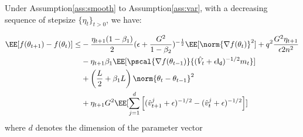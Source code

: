 \documentclass[11pt]{article}
\begin{document}
\begin{Lemma}\label{lem:lemma2}
Under Assumption\ref{ass:smooth} to Assumption\ref{ass:var}, with a decreasing sequence of stepsize $\{\eta_t\}_{t>0}$, we have:

\begin{equation}
\begin{split}
\EE[f(\theta_{t+1}) - f(\theta_{t}) ] \leq &   - \frac{\eta_{t+1}(1-\beta_1)}{2}  (\epsilon + \frac{G^2}{1 - \beta_2})^{-\frac{1}{2}} \EE[\norm{\nabla f(\theta_t)}^2] +q^2 \frac{G^2 \eta_{t+1}}{\epsilon 2n^2} \\
&- \eta_{t+1} \beta_1\EE[\pscal{\nabla f(\theta_{t-1})}{(\hat{V}_{t} + \epsilon \mathsf{I_d})^{-1/2} m_{t}}]\\
& +  \left(\frac{L}{2} + \beta_1 L \right) \norm{\theta_t - \theta_{t-1}}^2\\
&+   \eta_{t+1} G^2 \EE[\sum_{j=1}^d \left[(\hat{v}^j_{t+1} + \epsilon )^{-1/2} - (\hat{v}^j_{t} + \epsilon )^{-1/2}  \right] ]
\end{split}
\end{equation}
where $d$ denotes the dimension of the parameter vector
\end{Lemma}
\end{document}
